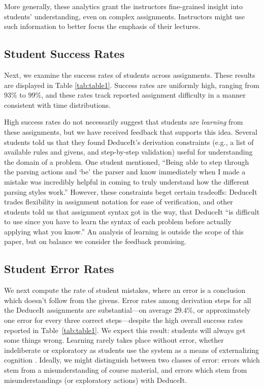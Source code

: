 \documentclass{sigchi}
\begin{document}
More generally, these analytics grant the instructors fine-grained insight into students' understanding, even on complex assignments. Instructors might use such information to better focus the emphasis of their lectures.

\subsection{Student Success Rates}

Next, we examine the success rates of students across assignments. These results are displayed in Table \ref{tab:table1}. Success rates are uniformly high, ranging from $93\%$ to $99\%$, and these rates track reported assignment difficulty in a manner consistent with time distributions. %

High success rates do not necessarily suggest that students are \textit{learning} from these assignments, but we have received feedback that supports this idea. Several students told us that they found DeduceIt's derivation constraints (e.g., a list of available rules and givens, and step-by-step validation) useful for understanding the domain of a problem. One student mentioned, ``Being able to step through the parsing actions and `be' the parser and know immediately when I made a mistake was incredibly helpful in coming to truly understand how the different parsing styles work.'' However, these constraints beget certain tradeoffs: DeduceIt trades flexibility in assignment notation for ease of verification, and other students told us that assignment syntax got in the way, that DeduceIt ``is difficult to use since you have to learn the syntax of each problem before actually applying what you know.'' An analysis of learning is outside the scope of this paper, but on balance we consider the feedback promising.

\subsection{Student Error Rates}

We next compute the rate of student mistakes, where an error is a conclusion which doesn't follow from the givens. Error rates among derivation steps for all the DeduceIt assignments are substantial---on average 29.4\%, or approximately one error for every three correct steps---despite the high overall success rates reported in Table~\ref{tab:table1}. We expect this result: students will always get some things wrong. Learning rarely takes place without error, whether indeliberate or exploratory as students use the system as a means of externalizing cognition \cite{citeulike}. Ideally, we might distinguish between two classes of error: errors which stem from a misunderstanding of course material, and errors which stem from misunderstandings (or exploratory actions) with DeduceIt. %
\end{document}
